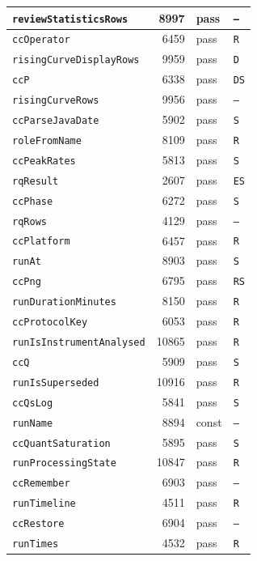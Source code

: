 {\begin{xltabular}{\linewidth}{|l|r|X|X|}
\texttt{reviewStatisticsRows} & 8997 & pass & \texttt{--} \\ \hline
\texttt{ccOperator} & 6459 & pass & \texttt{R} \\ \hline
\texttt{risingCurveDisplayRows} & 9959 & pass & \texttt{D} \\ \hline
\texttt{ccP} & 6338 & pass & \texttt{DS} \\ \hline
\texttt{risingCurveRows} & 9956 & pass & \texttt{--} \\ \hline
\texttt{ccParseJavaDate} & 5902 & pass & \texttt{S} \\ \hline
\texttt{roleFromName} & 8109 & pass & \texttt{R} \\ \hline
\texttt{ccPeakRates} & 5813 & pass & \texttt{S} \\ \hline
\texttt{rqResult} & 2607 & pass & \texttt{ES} \\ \hline
\texttt{ccPhase} & 6272 & pass & \texttt{S} \\ \hline
\texttt{rqRows} & 4129 & pass & \texttt{--} \\ \hline
\texttt{ccPlatform} & 6457 & pass & \texttt{R} \\ \hline
\texttt{runAt} & 8903 & pass & \texttt{S} \\ \hline
\texttt{ccPng} & 6795 & pass & \texttt{RS} \\ \hline
\texttt{runDurationMinutes} & 8150 & pass & \texttt{R} \\ \hline
\texttt{ccProtocolKey} & 6053 & pass & \texttt{R} \\ \hline
\texttt{runIsInstrumentAnalysed} & 10865 & pass & \texttt{R} \\ \hline
\texttt{ccQ} & 5909 & pass & \texttt{S} \\ \hline
\texttt{runIsSuperseded} & 10916 & pass & \texttt{R} \\ \hline
\texttt{ccQsLog} & 5841 & pass & \texttt{S} \\ \hline
\texttt{runName} & 8894 & const & \texttt{--} \\ \hline
\texttt{ccQuantSaturation} & 5895 & pass & \texttt{S} \\ \hline
\texttt{runProcessingState} & 10847 & pass & \texttt{R} \\ \hline
\texttt{ccRemember} & 6903 & pass & \texttt{--} \\ \hline
\texttt{runTimeline} & 4511 & pass & \texttt{R} \\ \hline
\texttt{ccRestore} & 6904 & pass & \texttt{--} \\ \hline
\texttt{runTimes} & 4532 & pass & \texttt{R} \\ \hline

\end{xltabular}}
